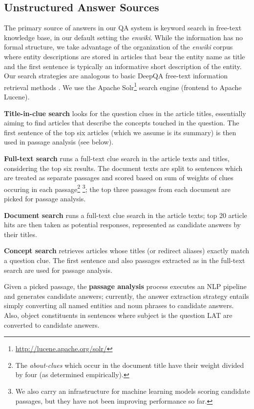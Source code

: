 \subsection{Unstructured Answer Sources}

The primary source of answers in our QA system is keyword search in free-text knowledge base,
in our default setting the \textit{enwiki}.
While the information has no formal structure, we take advantage of the organization of the \textit{enwiki} corpus
where entity descriptions are stored in articles that bear the entity name as title
and the first sentence is typically an informative short description of the entity.
Our search strategies are analogous to basic DeepQA free-text information retrieval methods \citep{WatsonIR}.
We use the Apache Solr\footnote{\url{http://lucene.apache.org/solr/}} search engine (frontend to Apache Lucene).

\textbf{Title-in-clue search} \citep{WatsonIR} looks for the question clues in the article titles,
essentially aiming to find articles that describe the concepts touched in the question.
The first sentence of the top six articles (which we assume is its summary)
is then used in passage analysis (see below).

\textbf{Full-text search} \citep{WatsonIR} runs a full-text clue search in the article texts and titles,
considering the top six results.
The document texts are split to sentences which are treated as separate passages
and scored based on sum of weights of clues occuring in each passage\footnote{%
The \textit{about-clues} which occur in the document title have their weight divided by four (as determined empirically).}%
\footnote{We also carry an infrastructure for machine learning models scoring candidate passages,
		but they have not been improving performance so far.};
the top three passages from each document are picked for passage analysis.

\textbf{Document search} \citep{WatsonIR} runs a full-text clue search in the article texts;
top 20 article hits are then taken as potential responses,
represented as candidate answers by their titles.

\textbf{Concept search} retrieves articles whose titles (or redirect aliases) exactly match a question clue.
The first sentence and also passages extracted as in the full-text search are used for passage analysis.

Given a picked passage, the \textbf{passage analysis} process executes an NLP pipeline and generates candidate answers;
currently, the answer extraction strategy entails simply converting all named entities and noun phrases to candidate answers.
Also, object constituents in sentences where subject is the question LAT are converted to candidate answers.

